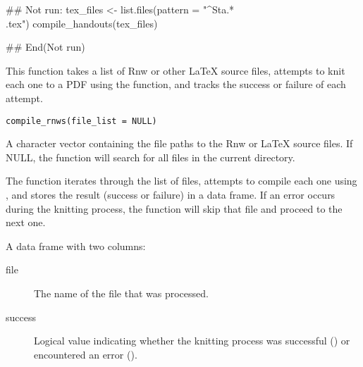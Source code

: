 \documentclass[a4paper]{book}
\begin{document}
%
\begin{Examples}
\begin{ExampleCode}
## Not run: 
  tex_files <- list.files(pattern = "^Sta.*\\.tex")
  compile_handouts(tex_files)

## End(Not run)

\end{ExampleCode}
\end{Examples}
%
\begin{Description}
This function takes a list of Rnw or other LaTeX source files, attempts to knit each one to a PDF using the  function, and tracks the success or failure of each attempt.
\end{Description}
%
\begin{Usage}
\begin{verbatim}
compile_rnws(file_list = NULL)
\end{verbatim}
\end{Usage}
%
\begin{Arguments}
\begin{ldescription}
\item[\code{file\_list}] A character vector containing the file paths to the Rnw or LaTeX source files. If NULL, the function will search for all  files in the current directory.
\end{ldescription}
\end{Arguments}
%
\begin{Details}
The function iterates through the list of files, attempts to compile each one using , and stores the result (success or failure) in a data frame. If an error occurs during the knitting process, the function will skip that file and proceed to the next one.
\end{Details}
%
\begin{Value}
A data frame with two columns:
\begin{description}

\item[file] The name of the file that was processed.
\item[success] Logical value indicating whether the knitting process was successful () or encountered an error ().

\end{description}

\end{Value}
%
\end{document}
